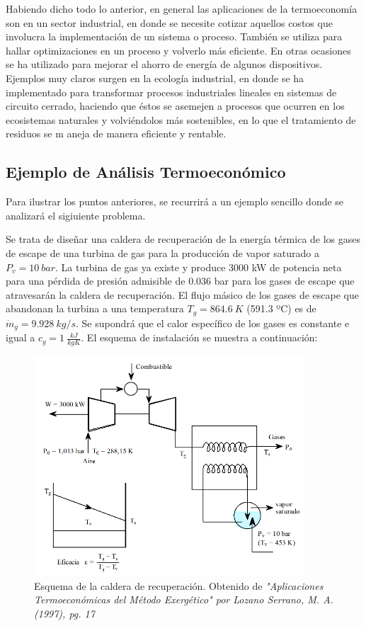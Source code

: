 \documentclass[12pt, letterpaper]{article}
\begin{document}
Habiendo dicho todo lo anterior, en general las aplicaciones de la termoeconomía son en un sector industrial, en donde se necesite cotizar aquellos costos que involucra la implementación de un sistema o proceso. También se utiliza para hallar optimizaciones en un proceso y volverlo más eficiente. En otras ocasiones se ha utilizado para mejorar el ahorro de energía de algunos dispositivos. Ejemplos muy claros surgen en la ecología industrial, en donde se ha implementado para transformar procesos industriales lineales en sistemas de circuito cerrado, haciendo que éstos se asemejen a procesos que ocurren en los ecosistemas naturales y volviéndolos más sostenibles, en lo que el tratamiento de residuos se m aneja de manera eficiente y rentable.
\subsection*{Ejemplo de Análisis Termoeconómico}
Para ilustrar los puntos anteriores, se recurrirá a un ejemplo sencillo donde se analizará el sigiuiente problema.

Se trata de diseñar una caldera de recuperación de la energía térmica de los gases de escape de una turbina de gas para la producción de vapor saturado a $P_v = 10\ bar$. La turbina de gas ya existe y produce  3000 kW de potencia neta para una pérdida de presión admisible de 0.036 bar para los gases de escape que atravesarán la caldera de recuperación. El flujo másico de los gases de escape que abandonan la turbina a una temperatura $T_g = 864.6\ K$ (591.3 ºC) es de $\dot{m}_g = 9.928\ kg/s$. Se supondrá que el calor específico de los gases es constante e igual a $c_g = 1\ \frac{kJ}{kg K}$. El esquema de instalación se muestra a continuación:

\begin{figure}[H]
	\centering
	\includegraphics[width=0.9\textwidth]{sys.png}
	\caption{Esquema de la caldera de recuperación. Obtenido de \textit{"Aplicaciones Termoeconómicas del Método Exergético" por Lozano Serrano, M. A. (1997), pg. 17}}
\end{figure}
\end{document}

